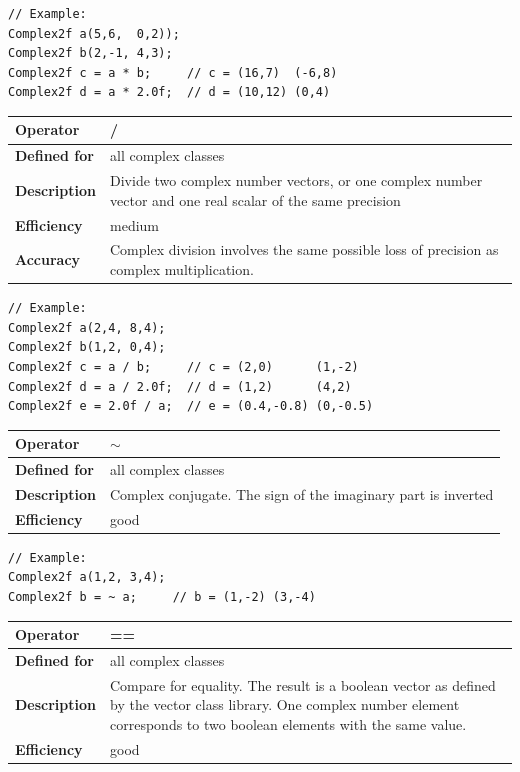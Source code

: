 \documentclass[11pt,a4paper,oneside,openright]{report}
\newcommand{\vspacesmall}{\vspace{3mm}}
\newcommand{\vspacebig}{\vspace{6mm}}
\begin{document}
\begin{lstlisting}[frame=none]
// Example:
Complex2f a(5,6,  0,2));
Complex2f b(2,-1, 4,3);
Complex2f c = a * b;     // c = (16,7)  (-6,8)
Complex2f d = a * 2.0f;  // d = (10,12) (0,4)
\end{lstlisting}
\vspacebig


\begin{tabular}{|p{25mm}|p{100mm}|}
\hline
\bfseries Operator & / \\ \hline
\bfseries Defined for & all complex classes  \\ \hline
\bfseries Description & Divide two complex number vectors, or one complex number vector and one real scalar of the same precision \\ \hline
\bfseries Efficiency & medium \\ \hline
\bfseries Accuracy & Complex division involves the same possible  loss of precision as complex multiplication. \\ \hline

\end{tabular}
\vspacesmall

\begin{lstlisting}[frame=none]
// Example:
Complex2f a(2,4, 8,4);
Complex2f b(1,2, 0,4);
Complex2f c = a / b;     // c = (2,0)      (1,-2)
Complex2f d = a / 2.0f;  // d = (1,2)      (4,2)
Complex2f e = 2.0f / a;  // e = (0.4,-0.8) (0,-0.5)
\end{lstlisting}
\vspacebig


\begin{tabular}{|p{25mm}|p{100mm}|}
\hline
\bfseries Operator & $\sim$ \\ \hline
\bfseries Defined for & all complex classes  \\ \hline
\bfseries Description & Complex conjugate. The sign of the imaginary part is inverted \\ \hline
\bfseries Efficiency & good \\ \hline
\end{tabular}
\vspacesmall

\begin{lstlisting}[frame=none]
// Example:
Complex2f a(1,2, 3,4);
Complex2f b = ~ a;     // b = (1,-2) (3,-4)
\end{lstlisting}
\vspacebig


\begin{tabular}{|p{25mm}|p{100mm}|}
\hline
\bfseries Operator & == \\ \hline
\bfseries Defined for & all complex classes  \\ \hline
\bfseries Description & Compare for equality.\newline
The result is a boolean vector as defined by the vector class library.\newline
One complex number element corresponds to two boolean elements with the same value. \\ \hline
\bfseries Efficiency & good \\ \hline
\end{tabular}
\vspacesmall
\end{document}
